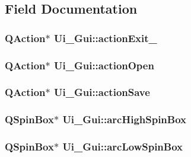 \subsection{Field Documentation}
\hypertarget{classUi__Gui_a6f7e1eee8cfb033020932a1e347fcab7}{
\subsubsection[{actionExit\_\-2}]{\setlength{\rightskip}{0pt plus 5cm}QAction$\ast$ {\bf Ui\_\-Gui::actionExit\_}}}
\label{classUi__Gui_a6f7e1eee8cfb033020932a1e347fcab7}
\hypertarget{classUi__Gui_a92b3eb1d5cac58fdea100712a6350bfa}{
\subsubsection[{actionOpen}]{\setlength{\rightskip}{0pt plus 5cm}QAction$\ast$ {\bf Ui\_\-Gui::actionOpen}}}
\label{classUi__Gui_a92b3eb1d5cac58fdea100712a6350bfa}
\hypertarget{classUi__Gui_a3c6e08973ab015f9504e13db7bb617ea}{
\subsubsection[{actionSave}]{\setlength{\rightskip}{0pt plus 5cm}QAction$\ast$ {\bf Ui\_\-Gui::actionSave}}}
\label{classUi__Gui_a3c6e08973ab015f9504e13db7bb617ea}
\hypertarget{classUi__Gui_ad77dd52c6b1aec3b511b2c7792b5e0c2}{
\subsubsection[{arcHighSpinBox}]{\setlength{\rightskip}{0pt plus 5cm}QSpinBox$\ast$ {\bf Ui\_\-Gui::arcHighSpinBox}}}
\label{classUi__Gui_ad77dd52c6b1aec3b511b2c7792b5e0c2}
\hypertarget{classUi__Gui_a393c5c0093fc0f98911b5f6a9cdaa4d4}{
\subsubsection[{arcLowSpinBox}]{\setlength{\rightskip}{0pt plus 5cm}QSpinBox$\ast$ {\bf Ui\_\-Gui::arcLowSpinBox}}}
